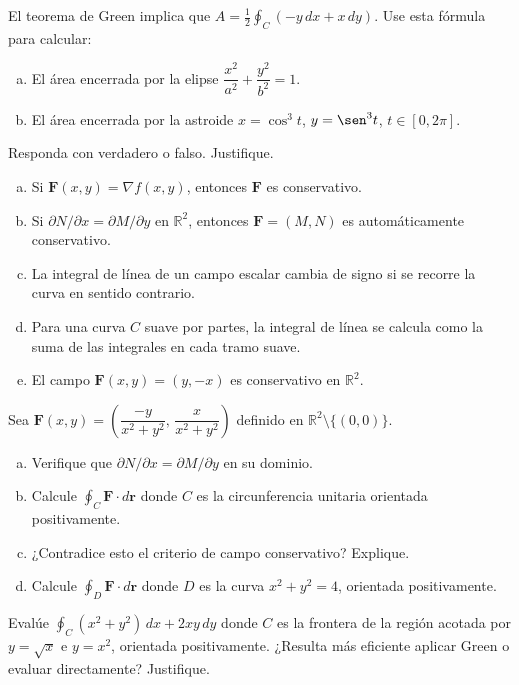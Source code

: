 \begin{prob}
El teorema de Green implica que \(A = \tfrac{1}{2}\oint_C (-y\,dx + x\,dy)\).
Use esta fórmula para calcular:
\begin{enumerate}[a)]
  \item El área encerrada por la elipse
  \(\dfrac{x^2}{a^2}+\dfrac{y^2}{b^2}=1\).
  \item El área encerrada por la astroide
  \(x = \cos^3 t\), \(y = \sen^3 t\), \(t\in[0,2\pi]\).
\end{enumerate}
\end{prob}

\begin{prob}
Responda con verdadero o falso. Justifique.
\begin{enumerate}[a)]
  \item Si \(\mathbf{F}(x,y) = \nabla f(x,y)\), entonces
  \(\mathbf{F}\) es conservativo.
  \item Si \(\partial N/\partial x = \partial M/\partial y\) en
  \(\mathbb{R}^2\), entonces \(\mathbf{F} = (M,N)\) es
  automáticamente conservativo.
  \item La integral de línea de un campo escalar cambia de signo
  si se recorre la curva en sentido contrario.
  \item Para una curva \(C\) suave por partes, la integral de línea
  se calcula como la suma de las integrales en cada tramo suave.
  \item El campo \(\mathbf{F}(x,y) = (y, -x)\) es conservativo en
  \(\mathbb{R}^2\).
\end{enumerate}
\end{prob}

\begin{prob}
Sea \(\mathbf{F}(x,y) = \left(\dfrac{-y}{x^2+y^2},\,
\dfrac{x}{x^2+y^2}\right)\) definido en \(\mathbb{R}^2 \setminus \{(0,0)\}\).
\begin{enumerate}[a)]
  \item Verifique que \(\partial N/\partial x = \partial M/\partial y\)
  en su dominio.
  \item Calcule \(\oint_C \mathbf{F}\cdot d\mathbf{r}\) donde \(C\) es
  la circunferencia unitaria orientada positivamente.
  \item ¿Contradice esto el criterio de campo conservativo? Explique.
  \item Calcule \(\oint_D \mathbf{F}\cdot d\mathbf{r}\) donde \(D\) es
  la curva \(x^2+y^2=4\), orientada positivamente.
\end{enumerate}
\end{prob}

\begin{prob}
Evalúe \(\displaystyle\oint_C (x^2 + y^2)\,dx + 2xy\,dy\) donde \(C\)
es la frontera de la región acotada por \(y = \sqrt{x}\) e \(y = x^2\),
orientada positivamente. ¿Resulta más eficiente aplicar Green o
evaluar directamente? Justifique.
\end{prob}

